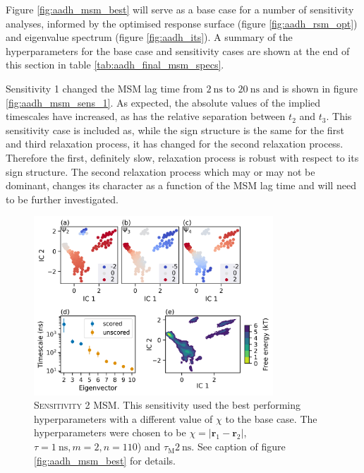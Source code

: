 Figure \ref{fig:aadh_msm_best} will serve as a base case for a number of sensitivity analyses, informed by the optimised response surface (figure \ref{fig:aadh_rsm_opt}) and eigenvalue spectrum (figure \ref{fig:aadh_its}). A summary of the hyperparameters for the base case and sensitivity cases are shown at the end of this section in table \ref{tab:aadh_final_msm_specs}. 

Sensitivity 1 changed the MSM lag time from $\SI{2}{\nano\second}$ to $\SI{20}{\nano\second}$ and is shown in figure \ref{fig:aadh_msm_sens_1}. As expected, the absolute values of the implied timescales have increased, as has the relative separation between $t_{2}$ and $t_{3}$. 
This sensitivity case is included as,  while the sign structure is the same for the first and third relaxation process, it has changed for the second relaxation process.  Therefore the first, definitely slow, relaxation process is robust with respect to its sign structure. The second relaxation process which may or may not be dominant, changes its character as a function of the MSM lag time and will need to be further investigated. 

\begin{figure}
    \centering
    \includegraphics[width=0.8\textwidth]{chapters/msm_optimization/figures/aadh_msm_sens_2.png}
    \caption[Sensitivity 2 MSM]{\textsc{Sensitivity 2 MSM}. This sensitivity used the best performing hyperparameters with a different value of $\chi$ to the base case. The hyperparameters were chosen to be $\chi= |\mathbf{r}_{1} - \mathbf{r}_{2}|$, $\tau = \SI{1}{\nano\second}, m=2, n=110$) and $\tau_{\mathrm{M}} \SI{2}{\nano\second}$. See caption of figure \ref{fig:aadh_msm_best} for details.}
    \label{fig:aadh_msm_sens_2}
\end{figure}

